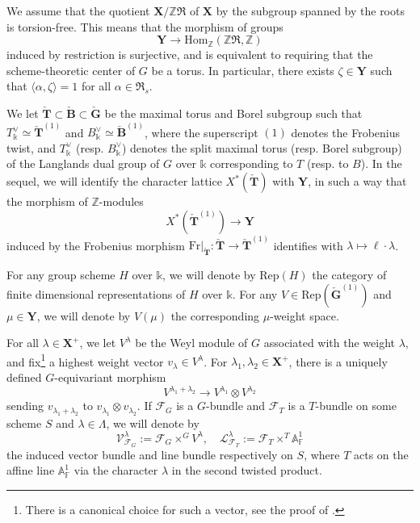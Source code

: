 \documentclass[11pt]{amsart}
\theoremstyle{plain}
\theoremstyle{remark}
\numberwithin{equation}{section}
\begin{document}
	We assume that the quotient $\mathbf{X}/\mathbb{Z}\mathfrak{R}$ of $\mathbf{X}$ by the subgroup spanned by the roots is torsion-free. This means that the morphism of groups
	$$\mathbf{Y}\to\mathrm{Hom}_\mathbb{Z}(\mathbb{Z}\mathfrak{R},\mathbb{Z})$$
	induced by restriction is surjective, and is equivalent to requiring that the scheme-theoretic center of $G$ be a torus. In particular, there exists $\zeta\in\mathbf{Y}$ such that $\langle\alpha,\zeta\rangle=1$ for all $\alpha\in\mathfrak{R}_s$.

 We let $\check{\mathbf{T}}\subset\check{\mathbf{B}}\subset\check{\mathbf{G}}$ be the maximal torus and Borel subgroup such that $T^\vee_\mathbb{k}\simeq\check{\mathbf{T}}^{(1)}$ and $B^\vee_\mathbb{k}\simeq\check{\mathbf{B}}^{(1)}$, where the superscript $(1)$ denotes the Frobenius twist, and $T^\vee_\mathbb{k}$ (resp. $B^\vee_\mathbb{k}$) denotes the split maximal torus (resp. Borel subgroup) of the Langlands dual group of $G$ over $\mathbb{k}$ corresponding to $T$ (resp. to $B$). In the sequel, we will identify the character lattice $X^*(\check{\mathbf{T}})$ with $\mathbf{Y}$, in such a way that the morphism of $\mathbb{Z}$-modules 
$$X^*(\check{\mathbf{T}}^{(1)})\to \mathbf{Y}$$ induced by the Frobenius morphism $\mathrm{Fr}|_{\check{\mathbf{T}}}:\check{\mathbf{T}}\to \check{\mathbf{T}}^{(1)}$ identifies with $\lambda\mapsto\ell\cdot\lambda$. 
	
	For any group scheme $H$ over $\mathbb{k}$, we will denote by $\mathrm{Rep}(H)$ the category of finite dimensional representations of $H$ over $\mathbb{k}$. For any $V\in\mathrm{Rep}(\check{\mathbf{G}}^{(1)})$ and $\mu\in\mathbf{Y}$, we will denote by $V(\mu)$ the corresponding $\mu$-weight space.
	
	
	For all $\lambda\in \mathbf{X}^+$, we let $V^\lambda$ be the Weyl module of $G$ associated with the weight $\lambda$, and fix\footnote{There is a canonical choice for such a vector, see the proof of \cite[Lemma II.2.13]{jantzen2003representations}.} a highest weight vector $v_\lambda\in V^\lambda$. For $\lambda_1,\lambda_2\in\mathbf{X}^+$, there is a uniquely defined $G$-equivariant morphism \begin{equation}\label{canonical morphism}
		V^{\lambda_1+\lambda_2}\to V^{\lambda_1}\otimes V^{\lambda_2}
	\end{equation}
	sending $v_{\lambda_1+\lambda_2}$ to $v_{\lambda_1}\otimes v_{\lambda_2}$. If $\mathcal{F}_G$ is a $G$-bundle and $\mathcal{F}_T$ is a $T$-bundle on some scheme $S$ and $\lambda\in\Lambda$, we will denote by 
	$$\mathcal{V}_{\mathcal{F}_G}^\lambda:=\mathcal{F}_G\times^GV^\lambda,\quad \mathcal{L}_{\mathcal{F}_T}^\lambda:=\mathcal{F}_T\times^{T}\mathbb{A}^1_\mathbb{F}$$ 
	the induced vector bundle and line bundle respectively on $S$, where $T$ acts on the affine line $\mathbb{A}^1_\mathbb{F}$ via the character $\lambda$ in the second twisted product.
\end{document}
